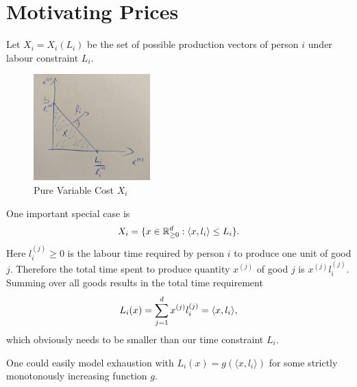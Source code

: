 \section{Motivating Prices}

Let \(X_i = X_i(L_i)\) be the set of possible production vectors of person \(i\)
under labour constraint \(L_i\).
\\
\begin{figure}
	\includegraphics[width=0.4\textwidth]{images/pure-variable-cost.jpeg}
	\caption{Pure Variable Cost \(X_i\)}
\end{figure}
\begin{example}
	One important special case is
	\[
		X_i = \{ x \in \mathbb{R}_{\ge 0}^d: \langle x, l_i \rangle \le L_i \}.
	\]
	Here \(l_i^{(j)}\ge0\) is the labour time required by person \(i\) to produce one
	unit of good \(j\). Therefore the total time spent to produce quantity
	\(x^{(j)}\) of good \(j\) is \(x^{(j)}l_i^{(j)}\). Summing over all goods
	results in the total time requirement
	\[
		L_i(x) = \sum_{j=1}^d x^{(j)}l_i^{(j)} = \langle x, l_i\rangle,
	\]
	which obviously needs to be smaller than our time constraint \(L_i\).

	One could easily model exhaustion with \(L_i(x) = g(\langle x, l_i\rangle)\)
	for some strictly monotonously increasing function \(g\).
\end{example}

